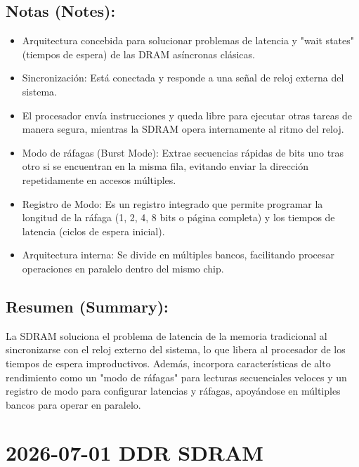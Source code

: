 \documentclass{article}
\begin{document}
\subsection{Notas (Notes):}
\label{sec:org7b11645}
\begin{itemize}
\item Arquitectura concebida para solucionar problemas de latencia y
"wait states" (tiempos de espera) de las DRAM asíncronas clásicas.
\item Sincronización: Está conectada y responde a una señal de reloj 
externa del sistema.
\item El procesador envía instrucciones y queda libre para ejecutar otras
tareas de manera segura, mientras la SDRAM opera internamente al 
ritmo del reloj.
\item Modo de ráfagas (Burst Mode): Extrae secuencias rápidas de bits 
uno tras otro si se encuentran en la misma fila, evitando enviar la 
dirección repetidamente en accesos múltiples.
\item Registro de Modo: Es un registro integrado que permite programar
la longitud de la ráfaga (1, 2, 4, 8 bits o página completa) y los
tiempos de latencia (ciclos de espera inicial).
\item Arquitectura interna: Se divide en múltiples bancos, facilitando
procesar operaciones en paralelo dentro del mismo chip.
\end{itemize}

\subsection{Resumen (Summary):}
\label{sec:orgf9b2129}
La SDRAM soluciona el problema de latencia de la memoria tradicional al
sincronizarse con el reloj externo del sistema, lo que libera al 
procesador de los tiempos de espera improductivos. Además, incorpora 
características de alto rendimiento como un "modo de ráfagas" para 
lecturas secuenciales veloces y un registro de modo para configurar 
latencias y ráfagas, apoyándose en múltiples bancos para operar en 
paralelo.

\section{2026-07-01 DDR SDRAM}
\label{sec:orgbe49be9}
\end{document}
